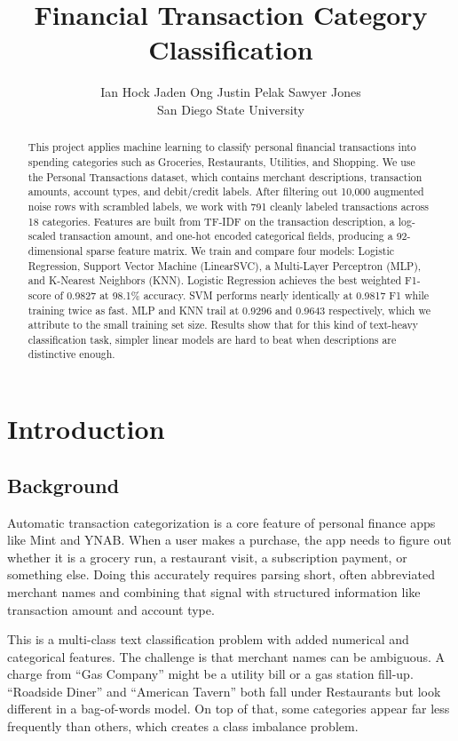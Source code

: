 \documentclass[11pt]{article}
\title{Financial Transaction Category Classification}
\author{%
  Ian Hock \quad Jaden Ong \quad Justin Pelak \quad Sawyer Jones \\[4pt]
  San Diego State University%
}
\begin{document}
\maketitle

\begin{abstract}
This project applies machine learning to classify personal financial transactions into spending categories such as Groceries, Restaurants, Utilities, and Shopping. We use the Personal Transactions dataset, which contains merchant descriptions, transaction amounts, account types, and debit/credit labels. After filtering out 10,000 augmented noise rows with scrambled labels, we work with 791 cleanly labeled transactions across 18 categories. Features are built from TF-IDF on the transaction description, a log-scaled transaction amount, and one-hot encoded categorical fields, producing a 92-dimensional sparse feature matrix. We train and compare four models: Logistic Regression, Support Vector Machine (LinearSVC), a Multi-Layer Perceptron (MLP), and K-Nearest Neighbors (KNN). Logistic Regression achieves the best weighted F1-score of 0.9827 at 98.1\% accuracy. SVM performs nearly identically at 0.9817 F1 while training twice as fast. MLP and KNN trail at 0.9296 and 0.9643 respectively, which we attribute to the small training set size. Results show that for this kind of text-heavy classification task, simpler linear models are hard to beat when descriptions are distinctive enough.
\end{abstract}

\section{Introduction}

\subsection{Background}

Automatic transaction categorization is a core feature of personal finance apps like Mint and YNAB. When a user makes a purchase, the app needs to figure out whether it is a grocery run, a restaurant visit, a subscription payment, or something else. Doing this accurately requires parsing short, often abbreviated merchant names and combining that signal with structured information like transaction amount and account type.

This is a multi-class text classification problem with added numerical and categorical features. The challenge is that merchant names can be ambiguous. A charge from ``Gas Company'' might be a utility bill or a gas station fill-up. ``Roadside Diner'' and ``American Tavern'' both fall under Restaurants but look different in a bag-of-words model. On top of that, some categories appear far less frequently than others, which creates a class imbalance problem.
\end{document}
